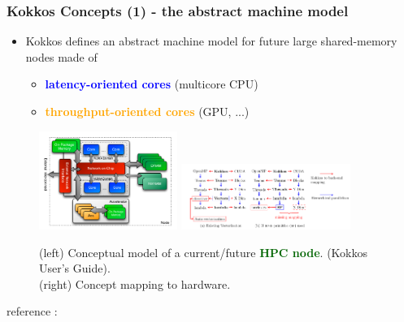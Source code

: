 \begin{frame}
  \frametitle{Kokkos Concepts (1) - the abstract machine model}

  \begin{itemize}
  \item Kokkos defines an abstract machine model for future large shared-memory nodes made of
    \begin{itemize}
    \item \textcolor{blue}{\bf latency-oriented cores} (multicore CPU)
    \item \textcolor{orange}{\bf throughput-oriented cores} (GPU, ...)
    \end{itemize}
  \end{itemize}

  \begin{center}
    \begin{figure}
      \includegraphics[width=4.5cm]{images/kokkos_machine_model}
      \includegraphics[width=5.5cm]{images/kokkos_simd}
      \caption{(left) Conceptual model of a current/future \textcolor{darkgreen}{\bf HPC node}. (Kokkos User's Guide).\\ (right) Concept mapping to hardware.}
    \end{figure}
    reference : 
  \end{center}

\end{frame}


